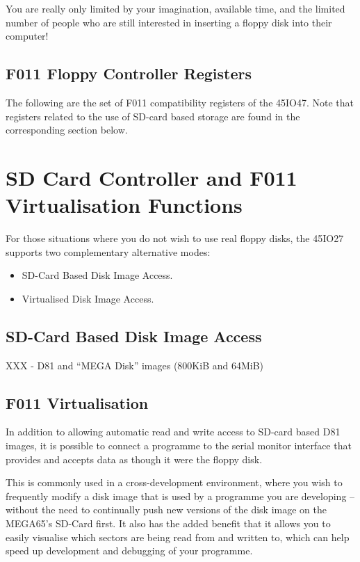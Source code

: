 You are really only limited by your imagination, available time, and
the limited number of people who are still interested in inserting a
floppy disk into their computer!

\subsection{F011 Floppy Controller Registers}

The following are the set of F011 compatibility registers of the 45IO47.
Note that registers related to the use of SD-card based storage are found in the corresponding section below.



\section{SD Card Controller and F011 Virtualisation Functions}

For those situations where you do not wish to use real floppy disks,
the 45IO27 supports two complementary alternative modes:

\begin{itemize}
\item SD-Card Based Disk Image Access.
\item Virtualised Disk Image Access.
\end{itemize}

\subsection{SD-Card Based Disk Image Access}

XXX - D81 and ``MEGA Disk'' images (800KiB and 64MiB)

\subsection{F011 Virtualisation}

In addition to allowing automatic read and write access to SD-card
based D81 images, it is possible to connect a programme to the serial
monitor interface that provides and accepts data as though it were the
floppy disk.

This is commonly used in a cross-development
environment, where you wish to frequently modify a disk image that is
used by a programme you are developing -- without the need to
continually push new versions of the disk image on the MEGA65's
SD-Card first. It also has the added benefit that it allows you to
easily visualise which sectors are being read from and written to,
which can help speed up development and debugging of your programme.

